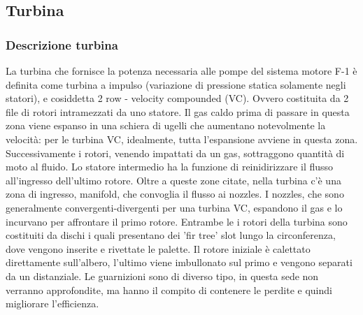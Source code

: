 
\subsection{Turbina}
\label{subsec:turbina}

\subsubsection{Descrizione turbina}


La turbina che fornisce la potenza necessaria alle pompe del sistema motore F-1 è definita come turbina a impulso (variazione di pressione statica solamente negli statori), e cosiddetta 2 row - velocity compounded (VC). Ovvero costituita da 2 file di rotori intramezzati da uno statore. Il gas caldo prima di passare in questa zona viene espanso in una schiera di ugelli che aumentano notevolmente la velocità: per le turbina VC, idealmente, tutta l'espansione avviene in questa zona. Successivamente i rotori, venendo impattati da un gas, sottraggono quantità di moto al fluido. Lo statore intermedio ha la funzione di reinidirizzare il flusso all'ingresso dell'ultimo rotore. Oltre a queste zone citate, nella turbina c'è una zona di ingresso, manifold, che convoglia il flusso ai nozzles. I nozzles, che sono generalmente convergenti-divergenti per una turbina VC, espandono il gas e lo incurvano per affrontare il primo rotore. Entrambe le i rotori della turbina sono costituiti da dischi i quali presentano dei 'fir tree' slot lungo la circonferenza, dove vengono inserite e rivettate le palette. Il rotore iniziale è calettato direttamente sull'albero, l'ultimo viene imbullonato sul primo e vengono separati da un distanziale. Le guarnizioni sono di diverso tipo, in questa sede non verranno approfondite, ma hanno il compito di contenere le perdite e quindi migliorare l'efficienza. 

